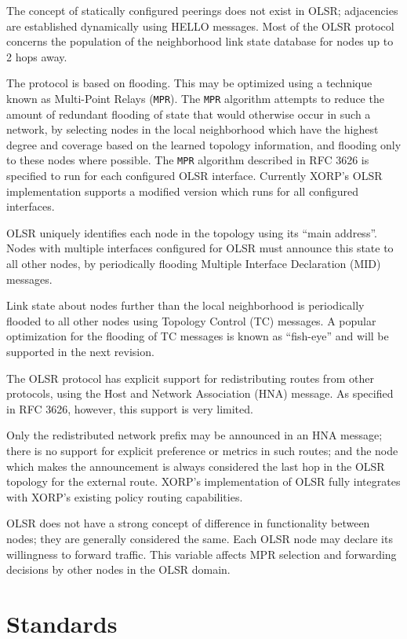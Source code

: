 The concept of statically configured peerings does not exist in OLSR;
adjacencies are established dynamically using HELLO messages. Most
of the OLSR protocol concerns the population of the neighborhood
link state database for nodes up to 2 hops away.

The protocol is based on flooding. This may be optimized using a
technique known as Multi-Point Relays ({\tt MPR}).
The {\tt MPR} algorithm attempts to reduce the amount of redundant flooding
of state that would otherwise occur in such a network, by selecting
nodes in the local neighborhood which have the highest degree and
coverage based on the learned topology information, and flooding
only to these nodes where possible.
The {\tt MPR} algorithm described in RFC 3626 is specified to run for each
configured OLSR interface. Currently XORP's OLSR implementation
supports a modified version which runs for all configured interfaces.

OLSR uniquely identifies each node in the topology using its ``main address''.
Nodes with multiple interfaces configured for OLSR must announce this state
to all other nodes, by periodically flooding Multiple Interface Declaration
(MID) messages.

Link state about nodes further than the local neighborhood is periodically
flooded to all other nodes using Topology Control (TC) messages.
A popular optimization for the flooding of TC messages is known as
``fish-eye'' and will be supported in the next revision.

The OLSR protocol has explicit support for redistributing routes from
other protocols, using the Host and Network Association (HNA) message.
As specified in RFC 3626, however, this support is very limited.

Only the redistributed network prefix may be announced in an HNA
message; there is no support for explicit preference or metrics in such
routes; and the node which makes the announcement is always considered the
last hop in the OLSR topology for the external route. XORP's implementation
of OLSR fully integrates with XORP's existing policy routing capabilities.

OLSR does not have a strong concept of difference in functionality
between nodes; they are generally considered the same. Each OLSR node may
declare its willingness to forward traffic. This variable affects MPR
selection and forwarding decisions by other nodes in the OLSR domain.

\section{Standards}

